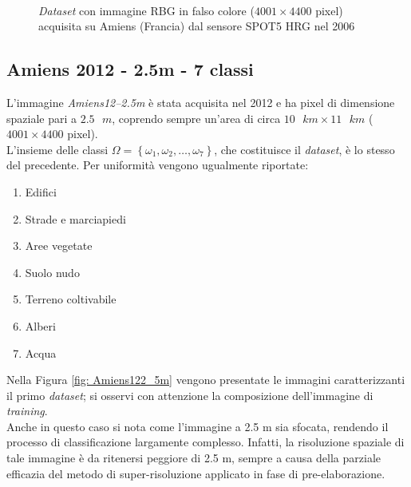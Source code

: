 \clearpage

\begin{figure}[!ht]
   \center
   \\%
     \hspace{4mm}
    \caption{\emph{Dataset} con immagine RBG in falso colore ($4001\times4400$ pixel) acquisita su Amiens (Francia) dal sensore \textsc{SPOT5 HRG} nel 2006}
    \label{fig: Amiens62_5m}
  \end{figure}
\clearpage


\subsection{Amiens 2012 - 2.5m - 7 classi}
L'immagine \emph{Amiens12--2.5m} è stata acquisita nel 2012 e ha pixel di dimensione spaziale pari a $2.5\text{ }m$, coprendo sempre un'area di circa $10\text{ }km\times11\text{ }km$ ($4001\times4400$ pixel).\\
L'insieme delle classi $\Omega=\left\lbrace\omega_1,\omega_2,\ldots,\omega_{7}\right\rbrace$, che costituisce il \emph{dataset}, è lo stesso del precedente. Per uniformità vengono ugualmente riportate:
\begin{enumerate}
\item Edifici
\item Strade e marciapiedi
\item Aree vegetate
\item Suolo nudo
\item Terreno coltivabile
\item Alberi
\item Acqua
\end{enumerate}
Nella Figura \ref{fig: Amiens122_5m} vengono presentate le immagini caratterizzanti il primo \emph{dataset}; si osservi con attenzione la composizione dell'immagine di \emph{training}.\\
Anche in questo caso si nota come l'immagine a 2.5 m sia sfocata, rendendo il processo di classificazione largamente complesso. Infatti, la risoluzione spaziale di tale immagine è da ritenersi peggiore di 2.5 m, sempre a causa della parziale efficazia del metodo di super-risoluzione applicato in fase di pre-elaborazione.

